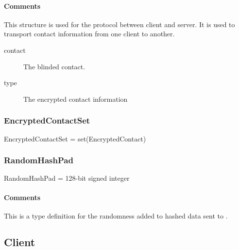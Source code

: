 \documentclass[a4paper,10pt]{article}
\begin{document}
\SpecialItem\paragraph*{Comments}
This structure is used for the protocol between client and server. It is used to transport contact information from one client to another.

\begin{description}
 \item[contact] The blinded contact.
 \item[type] The encrypted contact information
\end{description}

\subsubsection{EncryptedContactSet}

\begin{verbbox}
EncryptedContactSet = set(EncryptedContact)
\end{verbbox}
\begin{center}
\theverbbox
\end{center}

\begin{inparaitem}[ ]
 \item \unsecure
\end{inparaitem}

\subsubsection{RandomHashPad}

\begin{verbbox}
RandomHashPad = 128-bit signed integer
\end{verbbox}
\begin{center}
\theverbbox
\end{center}

\begin{inparaitem}[ ]
 \item \infrastructure
\end{inparaitem}

\SpecialItem\paragraph*{Comments}
This is a type definition for the randomness added to hashed data sent to \Server{}.

\subsection{Client}
\label{sec:structure:client}
\end{document}
